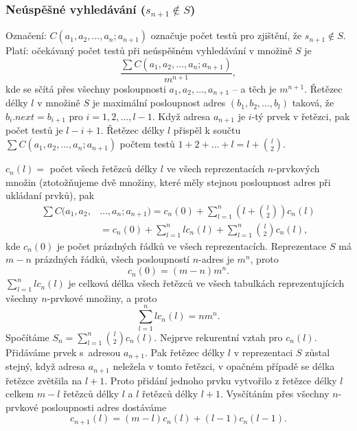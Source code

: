 \documentclass[a4paper,12pt]{article}
\begin{document}
\subsubsection{Neúspěšné vyhledávání ($s_{n+1}\notin S$) }

Označení: $C(a_1,a_2,\dots,a_n;a_{n+1})$ označuje počet 
testů pro zjiš\-tění, že $s_{n+1}\notin S$. Platí: 
očekávaný počet testů při 
neúspěšném vy\-hledávání v množině $S$ je 
$$\frac {\sum C(a_1,a_2,\dots,a_n;a_{n+1})}{m^{n+1}},$$
kde se sčítá přes všechny posloupnosti $a_1,a_2,\dots
,a_{n+1}$ -- 
a těch je $m^{n+1}$. \newline 
Řetězec délky $l$ v množině $S$ je maximální posloupnost 
adres $(b_1,b_2,\dots,b_l)$ taková, že $b_i.next=b_{i+1}$ pro 
$i=1,2,\dots,l-1$.
Když adresa $a_{n+1}$ je $i$-tý prvek v řetězci, pak počet 
testů je $l-i+1$. Řetězec délky $l$ přispěl k součtu 
$\sum C(a_1,a_2,\dots,a_n;a_{n+1})$ počtem testů $1+2+\dots+l=l+\binom l2$. 

$c_n(l)=$ počet všech řetězců délky $
l$ ve všech 
reprezentacích $n$-prvkových množin (ztotožňuje\-me dvě 
množiny, které měly stej\-nou posloupnost adres při 
ukládaní prvků), pak 
\begin{align*}\sum C(a_1,a_2,&\dots,a_n;a_{n+1})=c_n(0)+\sum_{l=1}^n(l+\binom 
l2)c_n(l)\\
&=c_n(0)+\sum_{l=1}^nlc_n(l)+\sum_{l=1}^n\binom l2c_n(l),\end{align*}
kde $c_n(0)$ je počet prázdných řádků ve všech 
reprezentacích. \newline 
Reprezentace $S$ má $m-n$ prázdných řádků,\newline 
všech posloupností $n$-adres je $m^n$, proto 
$$c_n(0)=(m-n)m^n.$$
$\sum_{l=1}^nlc_n(l)$ je celková délka všech řetězců ve 
všech tabulkách reprezentujících všechny $n$-prvkové 
množiny, a proto 
$$\sum_{l=1}^nlc_n(l)=nm^n.$$
Spočítáme $S_n=\sum_{l=1}^n\binom l2c_n(l)$.  Nejprve rekurentní vztah 
pro $c_n(l)$.  Přidáváme prvek s~adresou $a_{n+1}$.  Pak řetězec 
délky $l$ v reprezentaci $S$ zůstal stejný, když 
adresa $a_{n+1}$ neležela v tomto řetězci, v opačném případě 
se délka řetězce zvětšila na $l+1$.  Proto přidání jednoho 
prvku vytvořilo z řetězce délky $l$ celkem $m-l$ 
řetězců délky $l$ a $l$ řetězců délky $
l+1$.  
Vysčítáním přes všechny $n$-prvkové posloupnosti adres 
dostáváme 
$$c_{n+1}(l)=(m-l)c_n(l)+(l-1)c_n(l-1).$$
\end{document}
